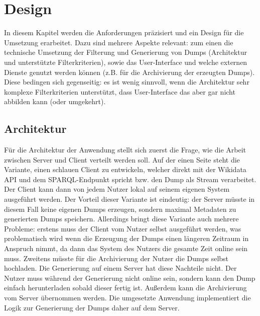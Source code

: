 \chapter{Design}
\label{chap:design}
In diesem Kapitel werden die Anforderungen präzisiert und ein Design für die Umsetzung erarbeitet.
Dazu sind mehrere Aspekte relevant: zum einen die technische Umsetzung der Filterung und Generierung von Dumps (Architektur und unterstützte Filterkriterien), sowie das User-Interface und welche externen Dienste genutzt werden können (z.B. für die Archivierung der erzeugten Dumps).
Diese bedingen sich gegenseitig: es ist wenig sinnvoll, wenn die Architektur sehr komplexe Filterkriterien unterstützt, dass User-Interface das aber gar nicht abbilden kann (oder umgekehrt).

\section{Architektur}
Für die Architektur der Anwendung stellt sich zuerst die Frage, wie die Arbeit zwischen Server und Client verteilt werden soll.
Auf der einen Seite steht die Variante, einen schlauen Client zu entwickeln, welcher direkt mit der Wikidata API und dem SPARQL-Endpunkt spricht bzw. den Dump als Stream verarbeitet.
Der Client kann dann von jedem Nutzer lokal auf seinem eigenen System ausgeführt werden.
Der Vorteil dieser Variante ist eindeutig: der Server müsste in diesem Fall keine eigenen Dumps erzeugen, sondern maximal Metadaten zu generierten Dumps speichern.
Allerdings bringt diese Variante auch mehrere Probleme: erstens muss der Client vom Nutzer selbst ausgeführt werden, was problematisch wird wenn die Erzeugung der Dumps einen längeren Zeitraum in Anspruch nimmt, da dann das System des Nutzers die gesamte Zeit online sein muss.
Zweitens müsste für die Archivierung der Nutzer die Dumps selbst hochladen.
Die Generierung auf einem Server hat diese Nachteile nicht.
Der Nutzer muss während der Generierung nicht online sein, sondern kann den Dump einfach herunterladen sobald dieser fertig ist.
Außerdem kann die Archivierung vom Server übernommen werden.
Die umgesetzte Anwendung implementiert die Logik zur Generierung der Dumps daher auf dem Server.

